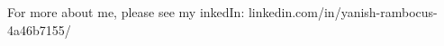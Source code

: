 \documentclass{resume} %
\begin{document}
\vspace{2em}

\small For more about me, please see my inkedIn: linkedin.com/in/yanish-rambocus-4a46b7155/





\end{document}
